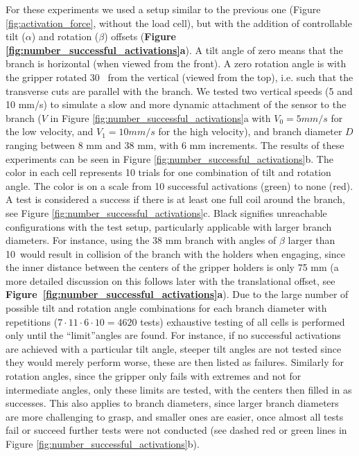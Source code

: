For these experiments we used a setup similar to the previous one (Figure \ref{fig:activation_force}, without the load cell), but with the addition of controllable tilt ($\alpha$) and rotation ($\beta$) offsets (\textbf{Figure \ref{fig:number_successful_activations}a}). A tilt angle of zero means that the branch
is horizontal (when viewed from the front). A zero rotation angle is with the gripper rotated \mbox{30\degree\ } from the vertical (viewed from the top), i.e. such that the transverse cuts are parallel with the branch. We tested two vertical speeds (5 and 10  mm/s) to simulate a slow and more dynamic attachment of the sensor to the branch ($V$ in Figure \ref{fig:number_successful_activations}a with $V_0=5mm/s$ for the low velocity, and $V_1=10mm/s$ for the high velocity), and branch diameter $D$ ranging between 8 mm and 38 mm, with 6 mm increments. The results of these experiments can be seen in Figure \ref{fig:number_successful_activations}b. The color in each cell represents 10 trials for one combination of tilt and rotation angle. The color is on a scale from 10 successful activations (green) to none (red). A test is considered a success if there is at least one full coil around the branch, see Figure \ref{fig:number_successful_activations}c. Black signifies unreachable configurations with the test setup, particularly applicable with larger branch diameters. For instance, using the 38 mm branch with angles of $\beta$ larger than 10\degree\ would result in collision of the branch with the holders when engaging, since the inner distance between the centers of the gripper holders is only 75 mm (a more detailed discussion on this follows later with the translational offset, see \mbox{\textbf{Figure \ref{fig:number_successful_activations}a}}). Due to the large number of possible tilt and rotation angle combinations for each branch diameter with repetitions ($7\cdot 11\cdot 6\cdot 10=4620$ tests) exhaustive testing of all cells is performed only until the ``limit''angles are found. For instance, if no successful activations are achieved with a particular tilt angle, steeper tilt angles are not tested since they would merely perform worse, these are then listed as failures. Similarly for rotation angles, since the gripper only fails with extremes and not for intermediate angles, only these limits are tested, with the centers then filled in as successes. This also applies to branch diameters, since larger branch diameters are more challenging to grasp, and smaller ones are easier, once almost all tests fail or succeed further tests were not conducted (see dashed red or green lines in Figure \ref{fig:number_successful_activations}b).

